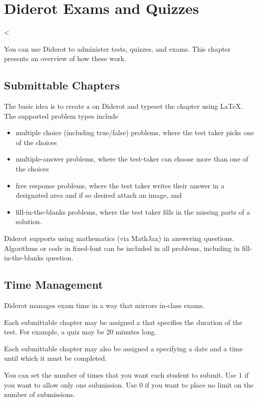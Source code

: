 \chapter{Diderot Exams and Quizzes}
\label{ch:quiz}
 
<\begin{preamble}
You can use Diderot to administer tests, quizzes, and exams.  This
chapter presents an overview of how these work.
\end{preamble}


\section{Submittable Chapters}
\label{ch:quiz::submittable-chapters}

The basic idea is to create a  on Diderot and typeset the chapter using LaTeX.  The supported problem types include
\begin{itemize}
\item multiple choice (including true/false) problems, where the test taker picks one of the
  choices
\item multiple-answer problems, where the test-taker can choose more than one of the choices
\item free response problems, where the test taker writes their answer in a designated area and if so desired attach an image, and
\item fill-in-the-blanks problems, where the test taker fills in the missing parts of a solution.
\end{itemize}

Diderot supports using mathematics (via MathJax) in answering questions.  
%
Algorithms or code in fixed-font can be included in all problems, including in fill-in-the-blanks question.

\section{Time Management}
\label{ch:quiz::time-management}

Diderot manages exam time in a way that mirrors in-class exams.

\begin{gram}
Each submittable chapter may be assigned a  that
specifies the duration of the test.  For example, a quiz may be 20
minutes long.

Each submittable chapter may also be assigned a  specifying a date and a time until which it must be completed. 

You can set the number of times that you want each student to submit.
Use $1$ if you want to allow only one submission.  Use $0$ if you want
to place no limit on the number of submissions.
\end{gram}

